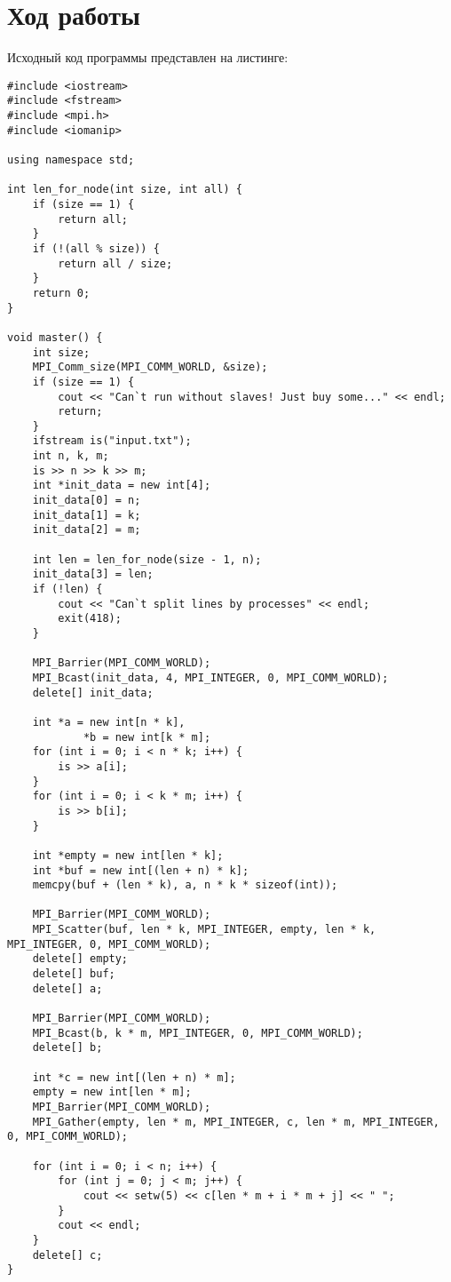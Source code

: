 \documentclass[a4paper,14pt]{extarticle}
\begin{document}
\section{Ход работы}
Исходный код программы представлен на листинге:
\begin{lstlisting}
#include <iostream> 
#include <fstream> 
#include <mpi.h> 
#include <iomanip> 
  
using namespace std; 
  
int len_for_node(int size, int all) { 
    if (size == 1) { 
        return all; 
    } 
    if (!(all % size)) { 
        return all / size; 
    } 
    return 0; 
} 
  
void master() { 
    int size; 
    MPI_Comm_size(MPI_COMM_WORLD, &size); 
    if (size == 1) { 
        cout << "Can`t run without slaves! Just buy some..." << endl; 
        return; 
    } 
    ifstream is("input.txt"); 
    int n, k, m; 
    is >> n >> k >> m; 
    int *init_data = new int[4]; 
    init_data[0] = n; 
    init_data[1] = k; 
    init_data[2] = m; 
  
    int len = len_for_node(size - 1, n); 
    init_data[3] = len; 
    if (!len) { 
        cout << "Can`t split lines by processes" << endl; 
        exit(418); 
    } 
  
    MPI_Barrier(MPI_COMM_WORLD); 
    MPI_Bcast(init_data, 4, MPI_INTEGER, 0, MPI_COMM_WORLD); 
    delete[] init_data; 
  
    int *a = new int[n * k], 
            *b = new int[k * m]; 
    for (int i = 0; i < n * k; i++) { 
        is >> a[i]; 
    } 
    for (int i = 0; i < k * m; i++) { 
        is >> b[i]; 
    } 
  
    int *empty = new int[len * k]; 
    int *buf = new int[(len + n) * k]; 
    memcpy(buf + (len * k), a, n * k * sizeof(int)); 
  
    MPI_Barrier(MPI_COMM_WORLD); 
    MPI_Scatter(buf, len * k, MPI_INTEGER, empty, len * k, MPI_INTEGER, 0, MPI_COMM_WORLD); 
    delete[] empty; 
    delete[] buf; 
    delete[] a; 
  
    MPI_Barrier(MPI_COMM_WORLD); 
    MPI_Bcast(b, k * m, MPI_INTEGER, 0, MPI_COMM_WORLD); 
    delete[] b; 
  
    int *c = new int[(len + n) * m]; 
    empty = new int[len * m]; 
    MPI_Barrier(MPI_COMM_WORLD); 
    MPI_Gather(empty, len * m, MPI_INTEGER, c, len * m, MPI_INTEGER, 0, MPI_COMM_WORLD); 
  
    for (int i = 0; i < n; i++) { 
        for (int j = 0; j < m; j++) { 
            cout << setw(5) << c[len * m + i * m + j] << " "; 
        } 
        cout << endl; 
    } 
    delete[] c; 
} 
  

\end{lstlisting}
\end{document}

